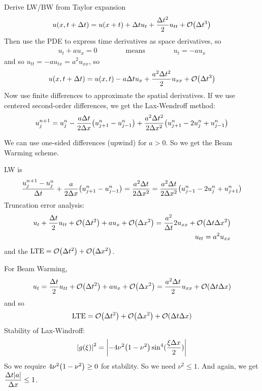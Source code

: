 \documentclass{article}
\newcommand{\Dx}{\Delta x}
\newcommand{\Dt}{\Delta t}
\begin{document}
        Derive LW/BW from Taylor expansion
        \begin{align*}
            u(x, t+\Dt) = u(x+t) + \Dt u_t + \frac{\Dt^2}{2}u_{tt} + \order{\Dt^3}
        \end{align*}
        Then use the PDE to express time derivatives as space derivatives, so
        \begin{align*}
            u_t + au_x = 0 \qquad\qquad\text{means}\qquad\qquad u_t = -au_x
        \end{align*}
        and so $u_{tt} = -au_{tx} = a^2 u_{xx}$, so
        \begin{align*}
            u(x, t + \Dt) = u(x,t) - a\Dt u_x + \frac{a^2\Dt^2}{2}u_{xx} + \order{\Dt^3}
        \end{align*}
        Now use finite differences to approximate the spatial derivatives.  If we use centered second-order differences, we get the Lax-Wendroff method:
        \begin{align*}
            u_j^{n+1} = u_j^n - \frac{a\Dt}{2\Dx}\qty(u_{j+1}^n - u_{j-1}^n) + \frac{a^2\Dt^2}{2\Dx^2}\qty(u_{j+1}^n - 2u_j^n + u_{j-1}^n)
        \end{align*}

        We can use one-sided differences (upwind) for $a > 0$.  So we get the Beam Warming scheme.

        LW is
        \begin{align*}
            \frac{u_j^{n+1} - u_j^n}{\Dt} + \frac{a}{2\Dx}\qty(u_{j+1}^n - u_{j-1}^n) = \frac{a^2\Dt}{2\Dx^2} = \frac{a^2\Dt}{2\Dx^2}\qty(u_{j-1}^n - 2u_j^n + u_{j+1}^n)
        \end{align*}
        Truncation error analysis:
        \begin{align*}
            u_t + \frac{\Dt}{2}u_{tt} + \order{\Dt^2} + au_x + \order{\Dx^2} = \frac{a^2}{\Dt}{2}u_{xx} + \order{\Dt\Dx^2} \\
            u_{tt} = a^2u_{xx}
        \end{align*}
        and the $\text{LTE} = \order{\Dt^2} + \order{\Dx^2}$.

        For Beam Warming,
        \begin{align*}
            u_t = \frac{\Dt}{2}u_{tt} + \order{\Dt^2} + au_x + \order{\Dx^2} = \frac{a^2\Dt}{2}u_{xx} + \order{\Dt\Dx}
        \end{align*}
        and so
        \begin{align*}
            \text{LTE} = \order{\Dt^2} + \order{\Dx^2} + \order{\Dt\Dx}
        \end{align*}
        Stability of Lax-Windroff:
        \begin{align*}
            \abs{g(\xi)}^2 = \abs{-4\nu^2\qty(1 - \nu^2)\sin^4(\frac{\xi\Dx}{2})}
        \end{align*}
        So we require $4\nu^2\qty(1 - \nu^2) \geq 0$ for stability.  So we need $\nu^2 \leq 1$.  And again, we get $\dfrac{\Dt\abs{a}}{\Dx} \leq 1$.
\end{document}
